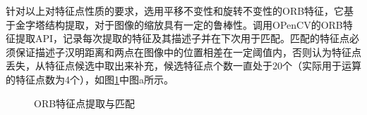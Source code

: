 \documentclass[fontset=fandol,type=bachelor,campus=harbin,bsmainpagenumberline=true]{hithesisbook}
\begin{document}
针对以上对特征点性质的要求，选用平移不变性和旋转不变性的ORB特征，它基于金字塔结构提取，对于图像的缩放具有一定的鲁棒性。调用OPenCV的ORB特征提取API，记录每次提取的特征及其描述子并在下次用于匹配。匹配的特征点必须保证描述子汉明距离和两点在图像中的位置相差在一定阈值内，否则认为特征点丢失，从特征点候选中取出来补充，候选特征点个数一直处于20个（实际用于运算的特征点数为4个），如图\ref{ORB特征点提取与匹配}中图a所示。
\begin{figure}[h]
	\centering
	\caption{ORB特征点提取与匹配}
	\label{ORB特征点提取与匹配}
\end{figure}
\end{document}

